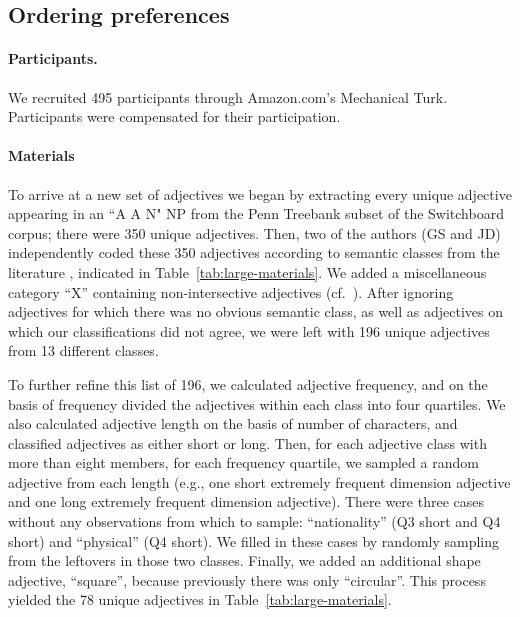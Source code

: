 \documentclass[12pt]{article}
\begin{document}
\subsection{Ordering preferences}

\paragraph{Participants.} We recruited 495 participants through Amazon.com's Mechanical Turk. Participants were compensated for their participation.

\paragraph{Materials}
To arrive at a new set of adjectives we began by extracting every unique adjective appearing in an ``A A N" NP from the Penn Treebank subset of the Switchboard corpus; there were 350 unique adjectives. Then, two of the authors (GS and JD) independently coded these 350 adjectives according to semantic classes from the literature \citep[e.g.,][]{dixon1982,Sproat1991}, indicated in Table~\ref{tab:large-materials}. We added a miscellaneous category ``X'' containing non-intersective adjectives (cf.~\citealp{Cinque2014}). After ignoring adjectives for which there was no obvious semantic class, as well as adjectives on which our classifications did not agree, we were left with 196 unique adjectives from 13 different classes.

To further refine this list of 196, we calculated adjective frequency, and on the basis of frequency divided the adjectives within each class into four quartiles. We also calculated adjective length on the basis of number of characters, and classified adjectives as either short or long. Then, for each adjective class with more than eight members, for each frequency quartile, we sampled a random adjective from each length (e.g., one short extremely frequent dimension adjective and one long extremely frequent dimension adjective). There were three cases without any observations from which to sample: ``nationality'' (Q3 short and Q4 short) and ``physical'' (Q4 short). We filled in these cases by randomly sampling from the leftovers in those two classes. Finally, we added an additional shape adjective, ``square'', because previously there was only ``circular''. This process yielded the 78 unique adjectives in Table~\ref{tab:large-materials}.%
\end{document}
